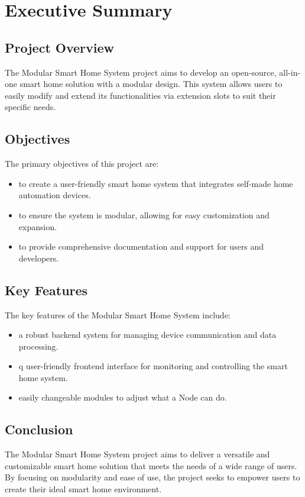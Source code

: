 \chapter{Executive Summary}

\section{Project Overview}
The Modular Smart Home System project aims to develop an open-source, 
all-in-one smart home solution with a modular design. This system 
allows users to easily modify and extend its functionalities via 
extension slots to suit their specific needs.

\section{Objectives}
The primary objectives of this project are:
\begin{itemize}
    \item to create a user-friendly smart home system that integrates self-made home automation devices.
    \item to ensure the system is modular, allowing for easy customization and expansion.
    \item to provide comprehensive documentation and support for users and developers.
\end{itemize}

\section{Key Features}
The key features of the Modular Smart Home System include:
\begin{itemize}
    \item a robust backend system for managing device communication and data processing.
    \item q user-friendly frontend interface for monitoring and controlling the smart home system.
    \item easily changeable modules to adjust what a Node can do.
\end{itemize}

\section{Conclusion}
The Modular Smart Home System project aims to deliver a versatile 
and customizable smart home solution that meets the needs of a wide 
range of users. By focusing on modularity and ease of use, the project 
seeks to empower users to create their ideal smart home environment.
